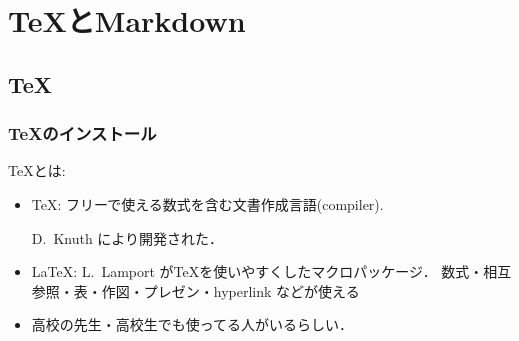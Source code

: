 %
%
%
%
%
%
%   

\chapter{TeXとMarkdown}

\section{\TeX}
\subsection{\TeX のインストール}
\TeX とは:  
\begin{itemize}
   \item 
   \TeX:  フリーで使える数式を含む文書作成言語(compiler). 
   
   D.~Knuth により開発された．
   
   \item
   \LaTeX:   L.~Lamport が\TeX を使いやすくしたマクロパッケージ．   
      数式・相互参照・表・作図・プレゼン・hyperlink などが使える
   
   \item
       高校の先生・高校生でも使ってる人がいるらしい．
\end{itemize}


